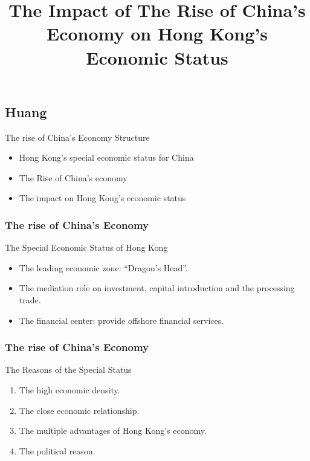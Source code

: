 \documentclass[slidestop,uncompress,mathsans, 12pt]{beamer}
\begin{document}
\subsection{Huang}
\begin{frame}
\title {The Impact of The Rise of China's Economy on Hong Kong's Economic Status}
\date{}
\titlepage
\end{frame}
\begin{frame}{The rise of China's Economy}
Structure\\
\begin{itemize}
\item Hong Kong's special economic status for China\\
\item The Rise of China's economy\\
\item The impact on Hong Kong's economic status\\

\end{itemize}

\end{frame}
\begin{frame}
\frametitle{The rise of China's Economy}
The Special Economic Status of Hong Kong\\
\bigskip
{}%
\begin{itemize}[<+->]
\item The leading economic zone: “Dragon's Head”.
\item The mediation role on investment, capital introduction and the processing trade.
\item The financial center: provide offshore financial services.
\end{itemize}
\pause
\end{frame}

\begin{frame}
\frametitle{The rise of China's Economy}
The Reasons of the Special Status\\
\bigskip
\begin{enumerate}[A]
\item The high economic density.
\bigskip
\item The close economic relationship.
\bigskip
\item The multiple advantages of Hong Kong's economy.
\bigskip
\item The political reason.
\end{enumerate}
\end{frame}
\end{document}
